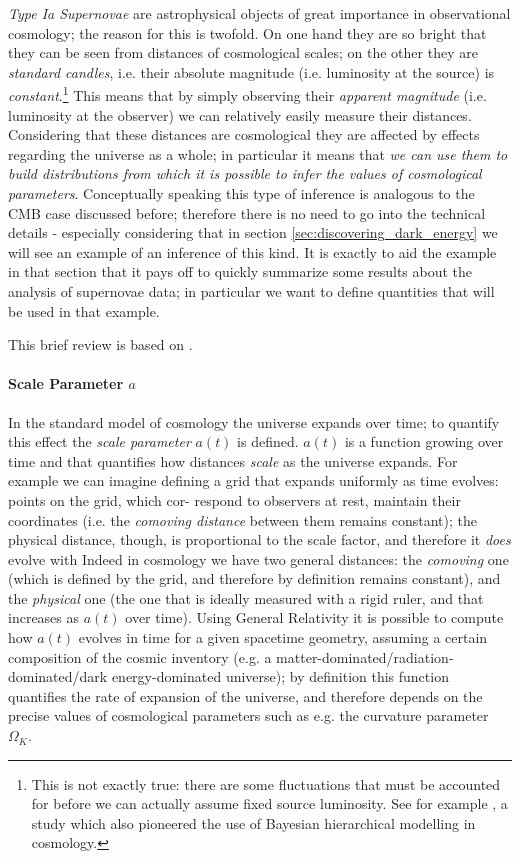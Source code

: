 \emph{Type Ia Supernovae} are astrophysical objects of great importance in observational cosmology; the reason for this is twofold. On one hand they are so bright that they can be seen from distances of cosmological scales; on the other they are \emph{standard candles}, i.e. their absolute magnitude (i.e. luminosity at the source) is \emph{constant}.\footnote{This is not exactly true: there are some fluctuations that must be accounted for before we can actually assume fixed source luminosity. See for example \cite{supernovae_bhm}, a study which also pioneered the use of Bayesian hierarchical modelling in cosmology.} This means that by simply observing their \emph{apparent magnitude} (i.e. luminosity at the observer) we can relatively easily measure their distances. Considering that these distances are cosmological they are affected by effects regarding the universe as a whole; in particular it means that \emph{we can use them to build distributions from which it is possible to infer the values of cosmological parameters}.
Conceptually speaking this type of inference is analogous to the CMB case discussed before; therefore there is no need to go into the technical details - especially considering that in section \ref{sec:discovering_dark_energy} we will see an example of an inference of this kind.
It is exactly to aid the example in that section that it pays off to quickly summarize some results about the analysis of supernovae data; in particular we want to define quantities that will be used in that example.

This brief review is based on \cite{modern_cosmology}.

\paragraph{Scale Parameter $a$}
In the standard model of cosmology the universe expands over time; to quantify this effect the \emph{scale parameter} $a(t)$ is defined. $a(t)$ is a function growing over time and that quantifies how distances \emph{scale} as the universe expands. For example we can imagine defining a grid that expands uniformly as time evolves: points on the grid, which cor-
respond to observers at rest, maintain their coordinates (i.e. the \emph{comoving distance} between them remains constant);  the physical distance, though, is proportional to the scale factor, and therefore it \emph{does} evolve with Indeed in cosmology we have two general distances: the \emph{comoving} one (which is defined by the grid, and therefore by definition remains constant), and the \emph{physical} one (the one that is ideally measured with a rigid ruler, and that increases as $a(t)$ over time). 
Using General Relativity it is possible to compute how $a(t)$ evolves in time for a given spacetime geometry, assuming a certain composition of the cosmic inventory (e.g. a matter-dominated/radiation-dominated/dark energy-dominated universe); by definition this function quantifies the rate of expansion of the universe, and therefore depends on the precise values of cosmological parameters such as e.g. the curvature parameter $\Omega_K$.

